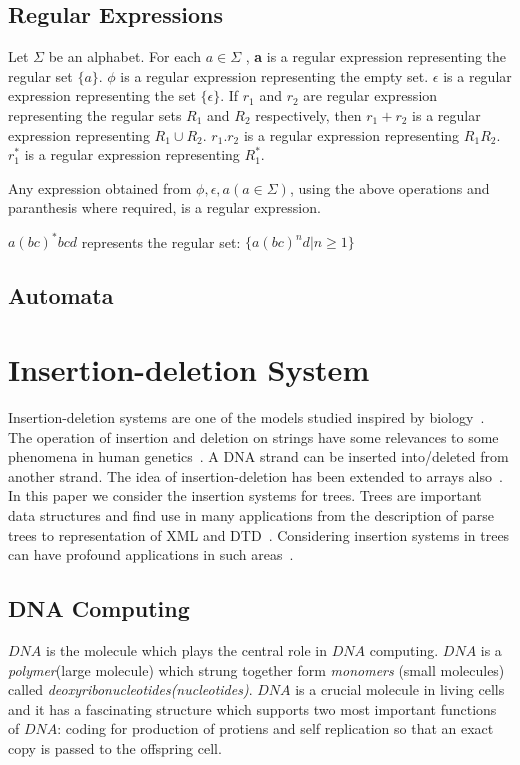 \subsection{Regular Expressions}
\begin{definition}
Let $\Sigma$ be an alphabet. For each $a \in \Sigma$ , \textbf{a} is a regular expression representing the regular set $\{a\}$. 
$\phi$ is a regular expression representing the empty set. $\epsilon$ is a regular expression representing the set $\{\epsilon \}$.
If \textbf{$r_1$} and \textbf{$r_2$} are regular expression representing the regular sets $R_1$ and $R_2$ respectively, 
then \textbf{$r_1+r_2$} is a regular expression representing $R_1\cup R_2$. \textbf{$r_1.r_2$} is a regular expression representing $R_1R_2$.
\textbf{$r_1^*$} is a regular expression representing $R_1^*$.

Any expression obtained from $\phi,\epsilon,a(a\in\Sigma)$, using the above operations and paranthesis where required, is a regular expression.
\end{definition}
\begin{example}
$a(bc)^*bcd$ represents the regular set:
$\{a(bc)^nd|n\geq 1\}$
\end{example}
\subsection{Automata}


\section{Insertion-deletion System}
Insertion-deletion systems are one of the models studied inspired by biology~\cite{paun}. The operation of insertion and deletion on strings have 
some relevances to some phenomena in human genetics~\cite{lila}. A DNA strand can be inserted into/deleted from another strand. The idea of 
insertion-deletion has been extended to arrays also~\cite{kamala}. In this paper we consider the insertion systems for trees. Trees are important 
data structures and find use in many applications from the description of parse trees to representation of XML and DTD~\cite{murata}. Considering
insertion systems in trees can have profound applications in such areas~\cite{akihiro}.

\subsection{DNA Computing}
$DNA$ is the molecule which plays the central role in $DNA$ computing. $DNA$ is a \emph{polymer}(large molecule) which strung together form 
\emph{monomers} (small molecules) called \emph{deoxyribonucleotides(nucleotides)}. $DNA$ is a crucial molecule in living cells and it has a
 fascinating structure which supports two most important functions of $DNA$: coding for production of protiens and self replication so that an exact
 copy is passed to the offspring cell.

